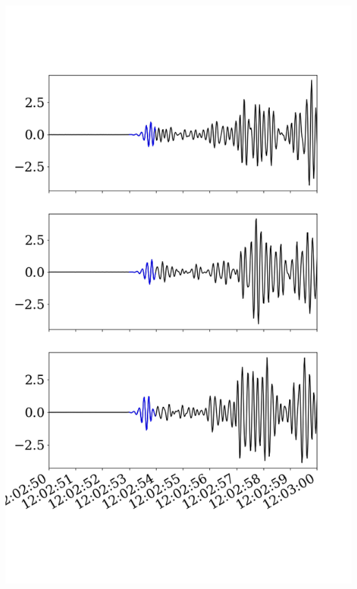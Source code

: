 \documentclass{beamer}
\begin{document}
\begin{frame}
\begin{minipage}{0.4\linewidth}
    \includegraphics[width=1.2\linewidth]{images/fig_3.png}
 \end{minipage}
 
\end{frame}
\end{document}
